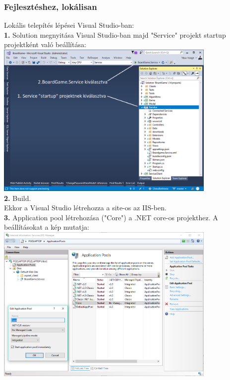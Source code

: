\documentclass[twoside, a4paper, 12pt]{article}
\begin{document}
\subsubsection{Fejlesztéshez, lokálisan}
\noindent Lokális telepítés lépései Visual Studio-ban: \\
\noindent \textbf{1.} Solution megnyitása Visual Studio-ban majd "Service" projekt startup projektként való beállítása: \\
\includegraphics[width=0.8\textwidth]{img/server_dev_run_1.png} \\

\noindent \textbf{2.} Build. \\
Ekkor a Visual Studio létrehozza a site-os az IIS-ben. \\

\noindent \textbf{3.} Application pool létrehozása ("Core") a .NET core-os projekthez. A beállításokat a kép mutatja: \\
\includegraphics[width=0.8\textwidth]{img/server_dev_run_2.png} \\
\end{document}
